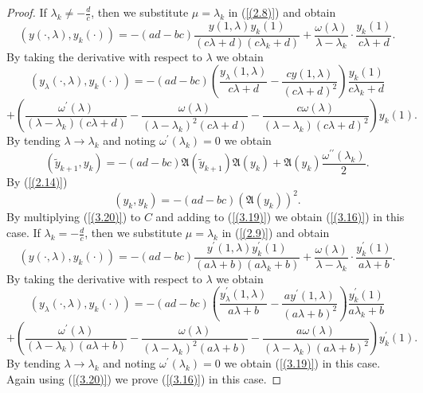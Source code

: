 \documentclass[10pt,a4paper]{amsart}
\numberwithin{equation}{section}
\begin{document}
\begin{proof}
If $\lambda_k\neq-\frac{d}{c}$, then we substitute $\mu=\lambda_k$ in (\ref{(2.8)}) and obtain 
\begin{equation}
\left(y(\cdot,\lambda), y_k(\cdot)\right)
= -(ad - bc)\frac{y(1,\lambda){y_k(1)}}{(c\lambda + d)(c{\lambda_k} + d)}+ \frac{\omega(\lambda)}{\lambda - {\lambda_k}} \cdot \frac{{y_k(1)}}{c\lambda + d}.\label{(3.17)}
\end{equation}
By taking the derivative with respect to $\lambda$ we obtain
$$
\left(y_\lambda(\cdot,\lambda), y_k(\cdot)\right)
= -(ad - bc)\left(\frac{y_\lambda{(1,\lambda)}}{c\lambda + d}-\frac{cy{(1,\lambda)}}{(c\lambda + d)^2}\right)\frac{{y_k(1)}}{c{\lambda_k} + d}
$$
\begin{equation}
    +\left(\frac{\omega^\prime(\lambda)}{(\lambda-\lambda_k)(c\lambda + d)}-\frac{\omega(\lambda)}{(\lambda-\lambda_k)^2(c\lambda + d)}-\frac{c\omega(\lambda)}{(\lambda-\lambda_k)(c\lambda + d)^2}\right)y_k(1).\label{(3.18)}
\end{equation}
By tending $\lambda\to\lambda_k$ and noting $\omega^\prime(\lambda_k)=0$ we obtain 
\begin{equation}
\left( \tilde{y}_{k + 1},y_{k} \right) = - (ad - bc)\mathfrak{A}(\tilde{y}_{k+1})\mathfrak{A}(y_{k})+\mathfrak{A}(y_k)\frac{\omega^{\prime\prime}(\lambda_k)}{2}. \label{(3.19)}
\end{equation}
By (\ref{(2.14)}) 
\begin{equation}
\left( {y}_{k},y_{k} \right) = - (ad - bc)(\mathfrak{A}(y_{k}))^2. \label{(3.20)}
\end{equation}
By multiplying (\ref{(3.20)}) to $C$ and adding to (\ref{(3.19)}) we obtain (\ref{(3.16)}) in this case.
If $\lambda_k=-\frac{d}{c}$, then we substitute $\mu=\lambda_k$ in (\ref{(2.9)}) and obtain 
\begin{equation}
\left(y(\cdot,\lambda), y_k(\cdot)\right)
= -(ad - bc)\frac{y^\prime(1,\lambda){y^\prime_k(1)}}{(a\lambda + b)(a{\lambda_k} + b)}+ \frac{\omega(\lambda)}{\lambda - {\lambda_k}} \cdot \frac{{y^\prime_k(1)}}{a\lambda + b}.\label{(3.21)}
\end{equation}
By taking the derivative with respect to $\lambda$ we obtain
$$
\left(y_\lambda(\cdot,\lambda), y_k(\cdot)\right)
= -(ad - bc)\left(\frac{y^\prime_\lambda{(1,\lambda)}}{a\lambda + b}-\frac{ay^\prime{(1,\lambda)}}{(a\lambda + b)^2}\right)\frac{{y^\prime_k(1)}}{a{\lambda_k} + b}
$$
\begin{equation}
    +\left(\frac{\omega^\prime(\lambda)}{(\lambda-\lambda_k)(a\lambda + b)}-\frac{\omega(\lambda)}{(\lambda-\lambda_k)^2(a\lambda + b)}-\frac{a\omega(\lambda)}{(\lambda-\lambda_k)(a\lambda + b)^2}\right)y^\prime_k(1).\label{(3.22)}
\end{equation}
By tending $\lambda\to\lambda_k$ and noting $\omega^\prime(\lambda_k)=0$ we obtain (\ref{(3.19)}) in this case. Again using (\ref{(3.20)}) we prove (\ref{(3.16)}) in this case.
\end{proof}
\end{document}
